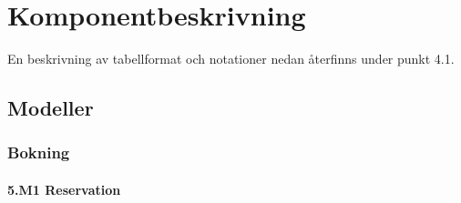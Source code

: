 \documentclass[a4paper, twoside, 11pt, titlepage]{article}
\begin{document}
\clearpage
\section{Komponentbeskrivning}


En beskrivning av tabellformat och notationer nedan återfinns under punkt 4.1.

	\subsection{Modeller}



		\subsubsection{Bokning}



			\paragraph{5.M1 Reservation}\
\end{document}
